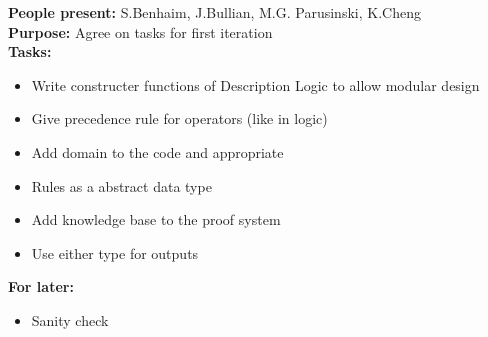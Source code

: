\documentclass[12pt]{article}
\begin{document}
\textbf{People present:} S.Benhaim, J.Bullian, M.G. Parusinski, K.Cheng \\
\textbf{Purpose:} Agree on tasks for first iteration \\
\textbf{Tasks:} \\ 
\begin{itemize}
\item Write constructer functions of Description Logic to allow modular design
\item Give precedence rule for operators (like in logic)
\item Add domain to the code and appropriate
\item Rules as a abstract data type
\item Add knowledge base to the proof system
\item Use either type for outputs
\end{itemize}
\textbf{For later:}
\begin{itemize}
\item Sanity check
\end{itemize}
\end{document}
